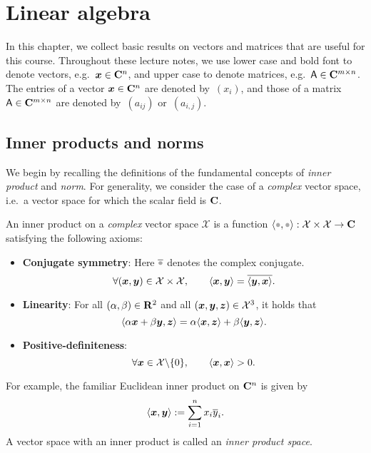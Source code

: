 \setlength{\OuterFrameSep}{0pt}

\chapter{Linear algebra}%
\label{cha:vectors_and_matrices}
\minitoc

In this chapter,
we collect basic results on vectors and matrices that are useful for this course.
Throughout these lecture notes,
we use lower case and bold font to denote vectors, e.g.\ $\mathbf{\boldsymbol{x}} \in \mathbf C^n$,
and upper case to denote matrices, e.g.\ $\mathsf A \in \mathbf C^{m \times n}$.
The entries of a vector $\mathbf{\boldsymbol{x}} \in \mathbf C^n$ are denoted by~$(x_i)$,
and those of a matrix $\mathsf A \in \mathbf C^{m \times n}$ are denoted by~$(a_{ij})$ or~$(a_{i,j})$.

\section{Inner products and norms}%
\label{sec:inner_product_and_norm}

We begin by recalling the definitions of the fundamental concepts of \emph{inner product} and \emph{norm}.
For generality,
we consider the case of a \emph{complex} vector space,
i.e.\ a vector space for which the scalar field is $\mathbf C$.
\begin{definition}
    An inner product on a \emph{complex} vector space $\mathcal X$ is a function $\ip{\placeholder,\placeholder}: \mathcal X \times \mathcal X \to \complex$ satisfying the following axioms:
    \begin{itemize}
        \item
            \textbf{Conjugate symmetry}:
            Here $\overline \placeholder$ denotes the complex conjugate.
            \[
                \forall (\mathbf{\boldsymbol{x}}, \mathbf{\boldsymbol{y}}) \in \mathcal X \times \mathcal X, \qquad
                \langle\mathbf{\boldsymbol{x}}, \mathbf{\boldsymbol{y}}\rangle = \overline{\langle\mathbf{\boldsymbol{y}}, \mathbf{\boldsymbol{x}}\rangle}.
            \]
        \item
            \textbf{Linearity}:
            For all $(\alpha, \beta) \in \mathbf R^2$ and all $(\mathbf{\boldsymbol{x}}, \mathbf{\boldsymbol{y}}, \mathbf{\boldsymbol{z}}) \in \mathcal X^3$,
            it holds that
            \[
                \langle\alpha \mathbf{\boldsymbol{x}} + \beta \mathbf{\boldsymbol{y}}, \mathbf{\boldsymbol{z}}\rangle
                = \alpha \langle\mathbf{\boldsymbol{x}}, \mathbf{\boldsymbol{z}}\rangle + \beta \langle\mathbf{\boldsymbol{y}}, \mathbf{\boldsymbol{z}}\rangle.
            \]

        \item
            \textbf{Positive-definiteness}:
            \[
                \forall \mathbf{\boldsymbol{x}} \in \mathcal X \backslash \{0\}, \qquad
                \langle\mathbf{\boldsymbol{x}}, \mathbf{\boldsymbol{x}}\rangle > 0.
            \]
    \end{itemize}
\end{definition}
For example, the familiar Euclidean inner product on $\mathbf C^n$ is given by
\[
    \langle\mathbf{\boldsymbol{x}}, \mathbf{\boldsymbol{y}}\rangle := \sum_{i=1}^{n} x_i \overline y_i.
\]
A vector space with an inner product is called an \emph{inner product space}.

